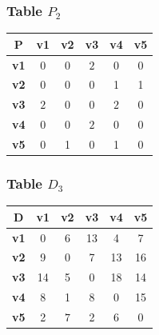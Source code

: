 \documentclass{beamer}
\begin{document}
\begin{frame}
\frametitle{Table $P_{2}$}
\begin{center}
    \begin{tabular}{|c||c|c|c|c|c|}
        \hline
        \textbf{P} & \textbf{v1} & \textbf{v2} & \textbf{v3} & \textbf{v4} & \textbf{v5} \\
        \hline
        \hline
        \textbf{v1}& 0 & 0 & \cellcolor[HTML]{D74894}$2$ & 0 & 0 \\
        \hline
        \textbf{v2}& 0 & 0 & 0 & 1 & 1 \\
        \hline
        \textbf{v3}& \cellcolor[HTML]{D74894}$2$ & 0 & 0 & \cellcolor[HTML]{D74894}$2$ & 0 \\
        \hline
        \textbf{v4}& 0 & 0 & \cellcolor[HTML]{D74894}$2$ & 0 & 0 \\
        \hline
        \textbf{v5}& 0 & 1 & 0 & 1 & 0 \\
        \hline
    \end{tabular}
\end{center}


\end{frame}





\begin{frame}
\frametitle{Table $D_{3}$}
\begin{center}
    \begin{tabular}{|c||c|c|c|c|c|}
        \hline
        \textbf{D} & \textbf{v1} & \textbf{v2} & \textbf{v3} & \textbf{v4} & \textbf{v5} \\
        \hline
        \hline
        \textbf{v1}& 0 & 6 & 13 & 4 & 7 \\
        \hline
        \textbf{v2}& 9 & 0 & 7 & 13 & 16 \\
        \hline
        \textbf{v3}& 14 & 5 & 0 & 18 & 14 \\
        \hline
        \textbf{v4}& 8 & 1 & 8 & 0 & 15 \\
        \hline
        \textbf{v5}& 2 & \cellcolor[HTML]{D74894}$7$ & 2 & 6 & 0 \\
        \hline
    \end{tabular}
\end{center}


\end{frame}
\end{document}
